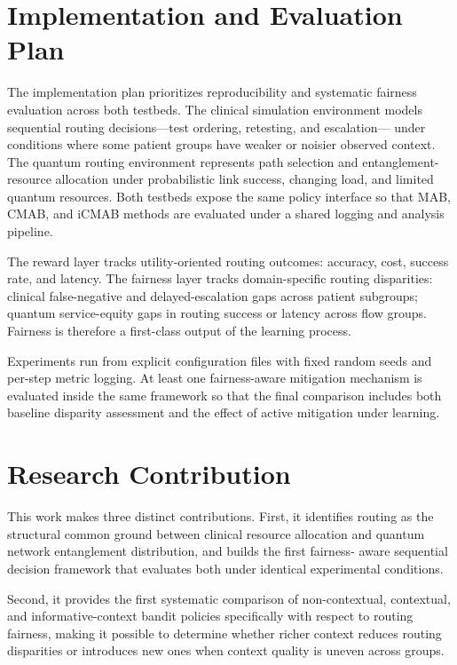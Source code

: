 \documentclass{IEEEtran}
\begin{document}
\section{Implementation and Evaluation Plan}

The implementation plan prioritizes reproducibility and systematic fairness
evaluation across both testbeds. The clinical simulation environment models
sequential routing decisions---test ordering, retesting, and escalation---
under conditions where some patient groups have weaker or noisier observed
context. The quantum routing environment represents path selection and
entanglement-resource allocation under probabilistic link success, changing
load, and limited quantum resources. Both testbeds expose the same policy
interface so that MAB, CMAB, and iCMAB methods are evaluated under a shared
logging and analysis pipeline.

The reward layer tracks utility-oriented routing outcomes: accuracy, cost,
success rate, and latency. The fairness layer tracks domain-specific routing
disparities: clinical false-negative and delayed-escalation gaps across
patient subgroups; quantum service-equity gaps in routing success or latency
across flow groups. Fairness is therefore a first-class output of the
learning process.

Experiments run from explicit configuration files with fixed random seeds and
per-step metric logging. At least one fairness-aware mitigation mechanism is
evaluated inside the same framework so that the final comparison includes
both baseline disparity assessment and the effect of active mitigation under
learning.

\section{Research Contribution}

This work makes three distinct contributions. First, it identifies routing
as the structural common ground between clinical resource allocation and
quantum network entanglement distribution, and builds the first fairness-
aware sequential decision framework that evaluates both under identical
experimental conditions.

Second, it provides the first systematic comparison of non-contextual,
contextual, and informative-context bandit policies specifically with respect
to routing fairness, making it possible to determine whether richer context
reduces routing disparities or introduces new ones when context quality is
uneven across groups.
\end{document}
